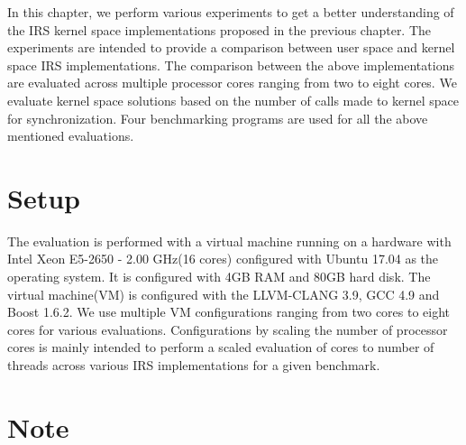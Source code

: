 In this chapter, we perform various experiments to get a better understanding of the IRS kernel space implementations proposed in the previous chapter. 
The experiments are intended to provide a comparison between user space and kernel space IRS implementations. 
The comparison between the above implementations are evaluated across multiple processor cores ranging from two to eight cores.  
We evaluate kernel space solutions based on the number of calls made to kernel space for synchronization. 
Four benchmarking programs are used for all the above mentioned evaluations.

\section{Setup}

The evaluation is performed with a virtual machine running on a hardware with Intel Xeon E5-2650 - 2.00 GHz(16 cores) configured with Ubuntu 17.04 as the operating system. 
It is configured with 4GB RAM and 80GB hard disk. 
The virtual machine(VM) is configured with the LLVM-CLANG 3.9, GCC 4.9 and Boost 1.6.2. 
We use multiple VM configurations ranging from two cores to eight cores for various evaluations. 
Configurations by scaling the number of processor cores is mainly intended to perform a scaled evaluation of cores to number of threads across various IRS implementations for a given benchmark.

\section*{Note}

